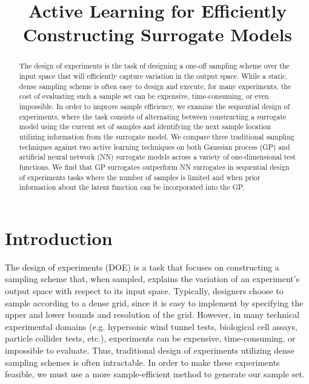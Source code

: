 \documentclass[conference]{IEEEtran}
\begin{document}
	
	
	\title{\LARGE \textbf{Active Learning for Efficiently Constructing Surrogate Models}}
	
	
	\author{
		} %
	
	
	\maketitle
	
	\begin{abstract}
		The design of experiments is the task of designing a one-off sampling scheme over the input space that will efficiently capture variation in the output space. While a static, dense sampling scheme is often easy to design and execute, for many experiments, the cost of evaluating such a sample set can be expensive, time-consuming, or even impossible. In order to improve sample efficiency, we examine the sequential design of experiments, where the task consists of alternating between constructing a surrogate model using the current set of samples and identifying the next sample location utilizing information from the surrogate model. We compare three traditional sampling techniques against two active learning techniques on both Gaussian process (GP) and artificial neural network (NN) surrogate models across a variety of one-dimensional test functions. We find that GP surrogates outperform NN surrogates in sequential design of experiments tasks where the number of samples is limited and when prior information about the latent function can be incorporated into the GP.
	\end{abstract}
	
	\section{Introduction}
	\label{sec:introduction}
	
	The design of experiments (DOE) is a task that focuses on constructing a sampling scheme that, when sampled, explains the variation of an experiment's output space with respect to its input space. Typically, designers choose to sample according to a dense grid, since it is easy to implement by specifying the upper and lower bounds and resolution of the grid. However, in many technical experimental domains (e.g. hypersonic wind tunnel tests, biological cell assays, particle collider tests, etc.), experiments can be expensive, time-consuming, or impossible to evaluate. Thus, traditional design of experiments utilizing dense sampling schemes is often intractable. In order to make these experiments feasible, we must use a more sample-efficient method to generate our sample set. 
	
\end{document}
